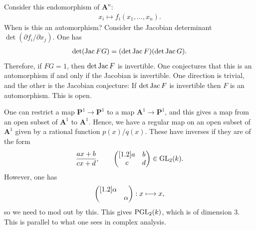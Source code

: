 \documentclass [11 pt, oneside, margin = 1 in] {article}
\begin{document}
\begin{example}\label{}\text{}
Consider this endomorphism of $\mathbf{A}^n$:
\begin{align*}
	x_i\longmapsto f_i(x_1,\hdots, x_n).
\end{align*}
When is this an automorphism? Consider the Jacobian determinant $\det (\partial f_i/\partial x_j)$. One has
\begin{align*}
	\det (\operatorname{Jac} FG) =  (\det \operatorname{Jac} F) (\det \operatorname{Jac} G).
\end{align*}
Therefore, if $FG = 1$, then $\det\operatorname{Jac} F$ is invertible. One conjectures that this is an automorphism if and only if the Jacobian is invertible. One direction is trivial, and the other is the Jacobian conjecture: If $\det \operatorname{Jac} F$ is invertible then $F$ is an automorphism. This is open.
\end{example}

\begin{example}\label{}\text{}
One can restrict a map $\mathbf{P}^1\longrightarrow \mathbf{P}^1$ to a map $\mathbf{A}^1\longrightarrow \mathbf{P}^1$, and this gives a map from an open subset of $\mathbf{A}^1$ to $\mathbf{A}^1$. Hence, we have a regular map on an open subset of $\mathbf{A}^1$ given by a rational function $p(x)/q (x)$. These have inverses if they are of the form
\begin{align*}
	\frac{ax+b}{cx+d},\qquad \begin{pmatrix} [ 1.2 ] a&b\\c&d\end{pmatrix}\in \operatorname{GL}_{2}(k).
\end{align*}
However, one has
\[
\begin{pmatrix} [ 1.2 ] \alpha\\&\alpha\end{pmatrix} : x\longmapsto x,
\]
so we need to mod out by this. This gives $\operatorname{PGL}_2( k)$, which is of dimension $3$. This is parallel to what one sees in complex analysis.
\end{example}
\end{document}
